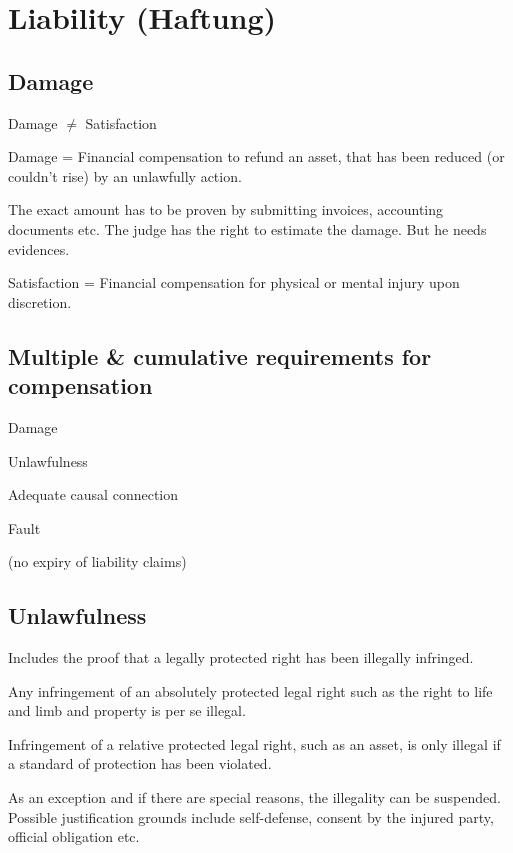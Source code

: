 \section{Liability (Haftung)}
\subsection{Damage}
\begin{compactitem}
	\item Damage $\neq$ Satisfaction
	\item Damage = Financial compensation to refund an asset, that has been reduced (or couldn’t rise) by an unlawfully action.
	\item The exact amount has to be proven by submitting invoices, accounting documents etc. The judge has the right to estimate the damage. But he needs evidences.
	\item Satisfaction = Financial compensation for physical or mental injury upon discretion.
\end{compactitem}

\subsection{Multiple \& cumulative requirements for compensation}
\begin{compactenum}
	\item Damage
	\item Unlawfulness
	\item Adequate causal connection
	\item Fault
	\item (no expiry of liability claims)
\end{compactenum}

\subsection{Unlawfulness}
\begin{compactitem}
	\item Includes the proof that a legally protected right has been illegally infringed.
	\item Any infringement of an absolutely protected legal right such as the right to life and limb and property is per se illegal.
	\item Infringement of a relative protected legal right, such as an asset, is only illegal if a standard of protection has been violated.
	\item As an exception and if there are special reasons, the illegality can be suspended. Possible justification grounds include self-defense, consent by the injured party, official obligation etc.
\end{compactitem}

